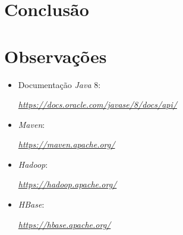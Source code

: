 \documentclass[a4paper]{report}
\begin{document}
\chapter{Conclusão} \label{ch:Conclusion}
\large{
	
}

\appendix
\chapter{Observações} \label{ch:Observations}
\begin{itemize}
    \item Documentação \textit{Java} 8:
    \par \textit{\url{https://docs.oracle.com/javase/8/docs/api/}}
	\item \textit{Maven}:
    \par \textit{\url{https://maven.apache.org/}}
    \item \textit{Hadoop}:
    \par \textit{\url{https://hadoop.apache.org/}}
    \item \textit{HBase}:
    \par \textit{\url{https://hbase.apache.org/}}
\end{itemize}
\end{document}
